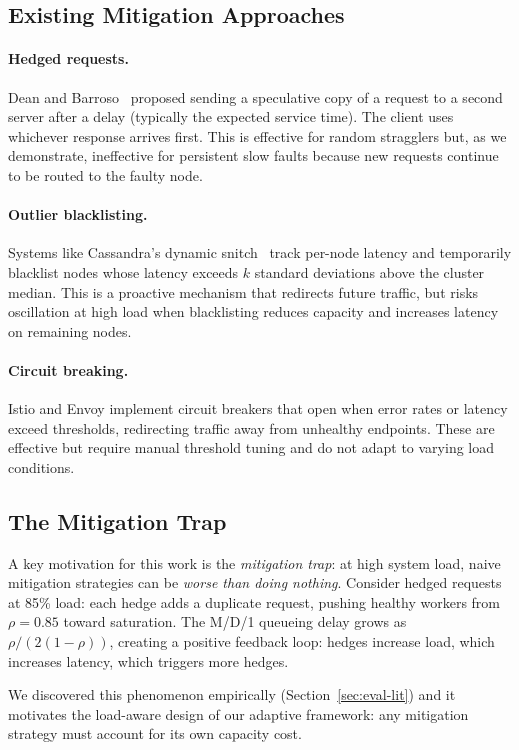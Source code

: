 \subsection{Existing Mitigation Approaches}

\paragraph{Hedged requests.}
Dean and Barroso~\cite{dean2013tail} proposed sending a speculative
copy of a request to a second server after a delay (typically the
expected service time). The client uses whichever response arrives
first. This is effective for random stragglers but, as we demonstrate,
ineffective for persistent slow faults because new requests continue to
be routed to the faulty node.

\paragraph{Outlier blacklisting.}
Systems like Cassandra's dynamic snitch~\cite{lakshman2010cassandra}
track per-node latency and temporarily blacklist nodes whose latency
exceeds $k$ standard deviations above the cluster median. This is a
proactive mechanism that redirects future traffic, but risks oscillation
at high load when blacklisting reduces capacity and increases latency on
remaining nodes.

\paragraph{Circuit breaking.}
Istio and Envoy implement circuit breakers that open when error rates or
latency exceed thresholds, redirecting traffic away from unhealthy
endpoints. These are effective but require manual threshold tuning and
do not adapt to varying load conditions.

\subsection{The Mitigation Trap}
\label{sec:trap}

A key motivation for this work is the \emph{mitigation trap}: at high
system load, naive mitigation strategies can be \emph{worse than doing
nothing}. Consider hedged requests at 85\% load: each hedge adds a
duplicate request, pushing healthy workers from $\rho = 0.85$ toward
saturation. The M/D/1 queueing delay grows as $\rho/(2(1-\rho))$,
creating a positive feedback loop: hedges increase load, which
increases latency, which triggers more hedges.

We discovered this phenomenon empirically (Section~\ref{sec:eval-lit})
and it motivates the load-aware design of our adaptive framework: any
mitigation strategy must account for its own capacity cost.
